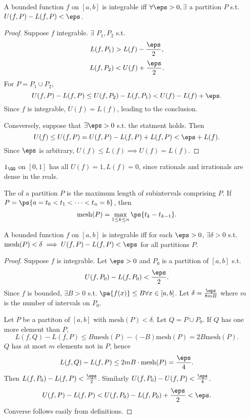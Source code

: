 \documentclass[11pt]{scrartcl}
\numberwithin{equation}{section}
\begin{document}
\begin{theorem}
    A bounded function $f$ on $[a,b]$ is integrable iff $\forall \eps>0, \exists$ a partition $P$ s.t. $U(f,P)-L(f,P)<\eps$. 
\end{theorem}
\begin{proof}
    Suppose $f$ integrable. $\exists$ $P_1,P_2$ s.t. 
    \[
        L(f,P_1) > L(f)-\frac{\eps}{2},
    \]
    \[
        L(f,P_2) < U(f)+\frac{\eps}{2}.
    \]
    For $P = P_1\cup P_2$, 
    \[
        U(f,P)-L(f,P) \leq U(f,P_2)-L(f,P_1) < U(f) - L(f) + \eps.
    \]
    Since $f$ is integrable, $U(f) = L(f)$, leading to the conclusion.

    Consversely, suppose that $\exists \eps>0$ s.t. the statment holds.
    Then 
    \[
        U(f) \leq U(f,P) = U(f,P) - L(f,P) + L(f,P) < \eps + L(f).
    \]
    Since $\eps$ is arbitrary, $U(f)\leq L(f)\implies U(f)=L(f)$.
\end{proof}
\begin{example}
    $1_\QQ$ on $[0,1]$ has all $U(f) = 1, L(f) = 0$, since rationals and irrationals are dense in the reals.
\end{example}
\begin{definition}
    The  of a partition $P$ is the maximum length 
    of subintervals comprising $P$.
    If $P = \ps{a=t_0<t_1<\cdots< t_n =b}$, then 
    \[ \mathrm{mesh}(P) = \max_{1\leq k\leq n}\ps{t_k-t_{k-1}}. \]
\end{definition}
\begin{theorem}
    \label{thm:darbouxdeltaeps}
    A bounded function $f$ on $[a,b]$ is integrable iff 
    for each $\eps>0$, $\exists \delta>0$ s.t. 
    $\mathrm{mesh}(P)<\delta\implies U(f,P)-L(f,P)<\eps$ for all 
    partitions $P$.
\end{theorem}
\begin{proof}
    Suppose $f$ is integrable. Let $\eps>0$ and $P_0$ is a partition of $[a,b]$ s.t. 
    \[
        U(f,P_0) - L(f,P_0) < \frac{\eps}{2}.
    \]
    Since $f$ is bounded, $\exists B>0$ s.t. $\pa{f(x)} \leq B \forall x\in[a,b]$. Let $\delta = \frac{\eps}{8mB}$ where $m$ is the number 
    of intervals on $P_0$.

    Let $P$ be a partiton of $[a,b]$ with $\mathrm{mesh}(P)<\delta$.
    Let $Q = P\cup P_0$. If $Q$ has one more element than $P$,
    \[
        L(f,Q) - L(f,P) \leq B \mathrm{mesh}(P) - (-B)\mathrm{mesh}(P) = 2B \mathrm{mesh}(P).
    \]
    $Q$ has at most $m$ elements not in $P$, hence 
    \[
        L(f,Q) - L(f,P) \leq2mB\cdot\mathrm{mesh}(P) = \frac{\eps}{4}.
    \]
    Then $L(f,P_0)-L(f,P)<\frac{\eps}{2}$. Similarly $U(f,P_0)-U(f,P)<\frac{\eps}{4}$. 
    \[
        U(f,P)-L(f,P) < U(f,P_0)-L(f,P_0) + \frac{\eps}{2} < \eps.
    \]
    Converse follows easily from definitions.
\end{proof}
\end{document}
